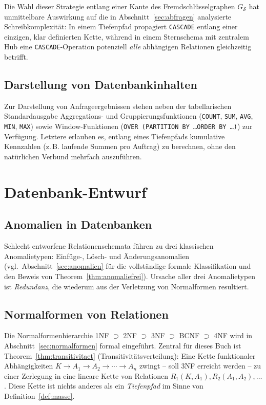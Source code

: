 ﻿\documentclass[a4paper,12pt]{report}
\theoremstyle{definition}
\theoremstyle{remark}
\begin{document}
Die Wahl dieser Strategie entlang einer Kante des Fremdschlüsselgraphen
$G_{\mathcal{S}}$ hat unmittelbare Auswirkung auf die in
Abschnitt~\ref{sec:abfragen} analysierte
Schreibkomplexität: In einem Tiefenpfad propagiert \texttt{CASCADE}
entlang einer einzigen, klar definierten Kette, während in einem
Sternschema mit zentralem Hub eine \texttt{CASCADE}-Operation potenziell
\emph{alle} abhängigen Relationen gleichzeitig betrifft.

\section{Darstellung von Datenbankinhalten}

Zur Darstellung von Anfrageergebnissen stehen neben der tabellarischen
Standardausgabe Aggregations- und Gruppierungsfunktionen
(\texttt{COUNT}, \texttt{SUM}, \texttt{AVG}, \texttt{MIN}, \texttt{MAX})
sowie Window-Funktionen (\texttt{OVER (PARTITION BY \ldots ORDER BY
\ldots)}) zur Verfügung. Letztere erlauben es, entlang eines
Tiefenpfads kumulative Kennzahlen (z.\,B. laufende Summen pro
Auftrag) zu berechnen, ohne den natürlichen Verbund mehrfach
auszuführen.

\chapter{Datenbank-Entwurf}
\label{ch:entwurf}

\section{Anomalien in Datenbanken}
\label{sec:anomalien-kurz}

Schlecht entworfene Relationenschemata führen zu drei klassischen
Anomalietypen: Einfüge-, Lösch- und Änderungsanomalien (vgl.\
Abschnitt~\ref{sec:anomalien} für die vollständige formale
Klassifikation und den Beweis von Theorem~\ref{thm:anomaliefrei}).
Ursache aller drei Anomalietypen ist \emph{Redundanz}, die wiederum aus
der Verletzung von Normalformen resultiert.

\section{Normalformen von Relationen}
\label{sec:normalformen-kurz}

Die Normalformenhierarchie 1NF $\supset$ 2NF $\supset$ 3NF $\supset$
BCNF $\supset$ 4NF wird in Abschnitt~\ref{sec:normalformen} formal
eingeführt. Zentral für dieses Buch ist
Theorem~\ref{thm:transitivitaet} (Transitivitätsverteilung): Eine
Kette funktionaler Abhängigkeiten $K \to A_1 \to A_2 \to \cdots \to A_n$
zwingt -- soll 3NF erreicht werden -- zu einer Zerlegung in eine lineare
Kette von Relationen $R_1(K,A_1), R_2(A_1,A_2), \ldots$. Diese Kette ist
nichts anderes als ein \emph{Tiefenpfad} im Sinne von
Definition~\ref{def:masse}.
\end{document}
